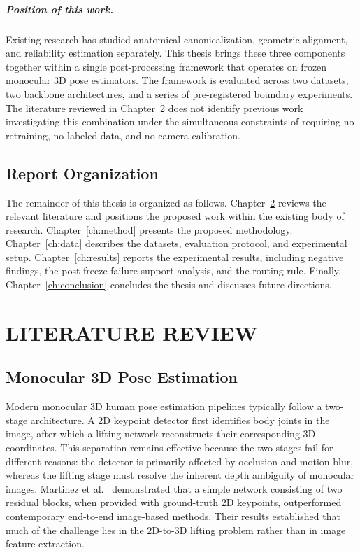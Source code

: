 \documentclass[12pt,a4paper]{report}
\begin{document}
\paragraph{Position of this work.} Existing research has studied anatomical canonicalization, geometric alignment, and reliability estimation separately. This thesis brings these three components together within a single post-processing framework that operates on frozen monocular 3D pose estimators. The framework is evaluated across two datasets, two backbone architectures, and a series of pre-registered boundary experiments. The literature reviewed in Chapter~\ref{ch:related} does not identify previous work investigating this combination under the simultaneous constraints of requiring no retraining, no labeled data, and no camera calibration.

\section{Report Organization}

The remainder of this thesis is organized as follows. Chapter~\ref{ch:related} reviews the relevant literature and positions the proposed work within the existing body of research. Chapter~\ref{ch:method} presents the proposed methodology. Chapter~\ref{ch:data} describes the datasets, evaluation protocol, and experimental setup. Chapter~\ref{ch:results} reports the experimental results, including negative findings, the post-freeze failure-support analysis, and the routing rule. Finally, Chapter~\ref{ch:conclusion} concludes the thesis and discusses future directions.

\chapter{LITERATURE REVIEW}
\label{ch:related}

\section{Monocular 3D Pose Estimation}

Modern monocular 3D human pose estimation pipelines typically follow a two-stage architecture. A 2D keypoint detector first identifies body joints in the image, after which a lifting network reconstructs their corresponding 3D coordinates. This separation remains effective because the two stages fail for different reasons: the detector is primarily affected by occlusion and motion blur, whereas the lifting stage must resolve the inherent depth ambiguity of monocular images. Martinez et al.~\cite{martinez} demonstrated that a simple network consisting of two residual blocks, when provided with ground-truth 2D keypoints, outperformed contemporary end-to-end image-based methods. Their results established that much of the challenge lies in the 2D-to-3D lifting problem rather than in image feature extraction.
\end{document}
